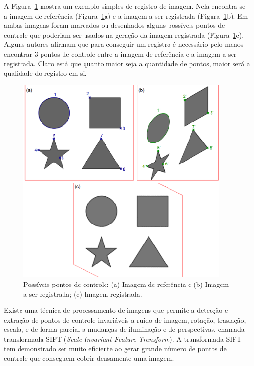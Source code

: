 A Figura~\ref{fig:img-reg} mostra um exemplo simples de registro de
imagem. Nela encontra-se a imagem de referência
(Figura~\ref{fig:img-reg}a) e a imagem a ser registrada
(Figura~\ref{fig:img-reg}b). Em ambas imagens foram marcados ou
desenhados alguns possíveis pontos de controle que poderiam ser usados
na geração da imagem registrada (Figura~\ref{fig:img-reg}c). Alguns
autores afirmam que para conseguir um registro é necessário pelo menos
encontrar 3 pontos de controle entre a imagem de referência e a imagem
a ser registrada.\cite{84} Claro está que quanto maior seja a
quantidade de pontos, maior será a qualidade do registro em
si.\cite{77}

\begin{figure} [h]
  \begin{center}
    \includegraphics[height=296pt,width=300pt]{images/fig_img-reg}
    \caption{Possíveis pontos de controle: (a) Imagem de referência e
      (b) Imagem a ser registrada; (c) Imagem
      registrada.}\label{fig:img-reg}
  \end{center}
\end{figure}

Existe uma técnica de processamento de imagens que permite a detecção
e extração de pontos de controle invariáveis a ruído de imagem,
rotação, traslação, escala, e de forma parcial a mudanças de
iluminação e de perspectivas, chamada transformada SIFT (\textit{Scale
  Invariant Feature Transform}). A transformada SIFT tem demonstrado
ser muito eficiente ao gerar grande número de pontos de controle que
conseguem cobrir densamente uma imagem.\cite{85}


